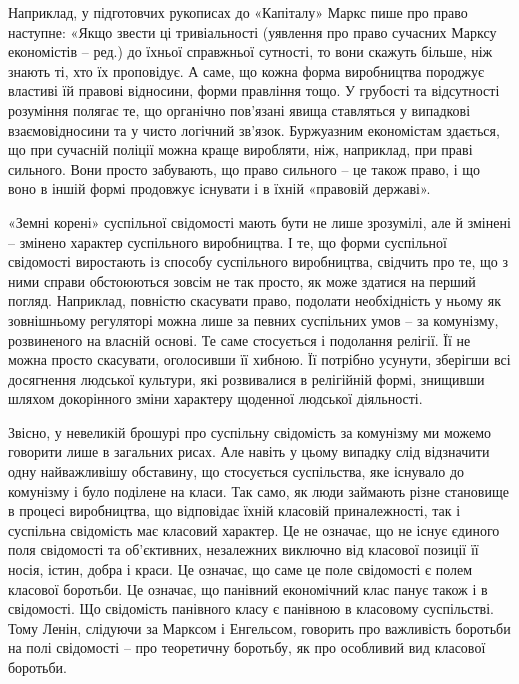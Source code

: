 \documentclass[12pt,a4paper,openany]{book}
\begin{document}
Наприклад, у підготовчих рукописах до «Капіталу» Маркс пише про право наступне: «Якщо звести ці тривіальності (уявлення про право сучасних Марксу економістів – ред.) до їхньої справжньої сутності, то вони скажуть більше, ніж знають ті, хто їх проповідує. А саме, що кожна форма виробництва породжує властиві їй правові відносини, форми правління тощо. У грубості та відсутності розуміння полягає те, що органічно пов’язані явища ставляться у випадкові взаємовідносини та у чисто логічний зв’язок. Буржуазним економістам здається, що при сучасній поліції можна краще виробляти, ніж, наприклад, при праві сильного. Вони просто забувають, що право сильного – це також право, і що воно в іншій формі продовжує існувати і в їхній «правовій державі».

«Земні корені» суспільної свідомості мають бути не лише зрозумілі, але й змінені – змінено характер суспільного виробництва. І те, що форми суспільної свідомості виростають із способу суспільного виробництва, свідчить про те, що з ними справи обстоюються зовсім не так просто, як може здатися на перший погляд. Наприклад, повністю скасувати право, подолати необхідність у ньому як зовнішньому регуляторі можна лише за певних суспільних умов – за комунізму, розвиненого на власній основі. Те саме стосується і подолання релігії. Її не можна просто скасувати, оголосивши її хибною. Її потрібно усунути, зберігши всі досягнення людської культури, які розвивалися в релігійній формі, знищивши шляхом докорінного зміни характеру щоденної людської діяльності.

Звісно, у невеликій брошурі про суспільну свідомість за комунізму ми можемо говорити лише в загальних рисах. Але навіть у цьому випадку слід відзначити одну найважливішу обставину, що стосується суспільства, яке існувало до комунізму і було поділене на класи. Так само, як люди займають різне становище в процесі виробництва, що відповідає їхній класовій приналежності, так і суспільна свідомість має класовий характер. Це не означає, що не існує єдиного поля свідомості та об’єктивних, незалежних виключно від класової позиції її носія, істин, добра і краси. Це означає, що саме це поле свідомості є полем класової боротьби. Це означає, що панівний економічний клас панує також і в свідомості. Що свідомість панівного класу є панівною в класовому суспільстві. Тому Ленін, слідуючи за Марксом і Енгельсом, говорить про важливість боротьби на полі свідомості – про теоретичну боротьбу, як про особливий вид класової боротьби.
\end{document}
